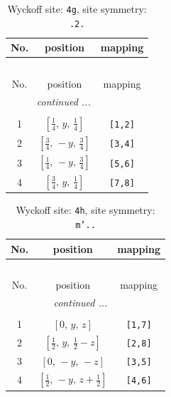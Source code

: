 \documentclass[fleqn,8pt]{jsarticle}
\begin{document}
\renewcommand{\arraystretch}{1.2}
\begin{longtable}{ccc}
\caption{Wyckoff site: {\tt 4g}, site symmetry: {\tt .2.}}
 \\
 \hline \hline
No. & position & mapping \\ \hline \endfirsthead

\multicolumn{2}{l}{\tablename\ \thetable{}} \\
 \hline \hline
No. & position & mapping \\ \hline \endhead

 \hline \hline
\multicolumn{2}{r}{\footnotesize\it continued ...} \\ \endfoot

 \hline \hline
\multicolumn{2}{r}{} \\ \endlastfoot

1 & $\left[ \frac{1}{4},\, y,\, \frac{1}{4} \right]$ & {\tt [1,2]} \\ \hline
2 & $\left[ \frac{3}{4},\, - y,\, \frac{3}{4} \right]$ & {\tt [3,4]} \\ \hline
3 & $\left[ \frac{1}{4},\, - y,\, \frac{3}{4} \right]$ & {\tt [5,6]} \\ \hline
4 & $\left[ \frac{3}{4},\, y,\, \frac{1}{4} \right]$ & {\tt [7,8]} \\
\end{longtable}
\renewcommand{\arraystretch}{1.2}
\begin{longtable}{ccc}
\caption{Wyckoff site: {\tt 4h}, site symmetry: {\tt m'..}}
 \\
 \hline \hline
No. & position & mapping \\ \hline \endfirsthead

\multicolumn{2}{l}{\tablename\ \thetable{}} \\
 \hline \hline
No. & position & mapping \\ \hline \endhead

 \hline \hline
\multicolumn{2}{r}{\footnotesize\it continued ...} \\ \endfoot

 \hline \hline
\multicolumn{2}{r}{} \\ \endlastfoot

1 & $\left[ 0,\, y,\, z \right]$ & {\tt [1,7]} \\ \hline
2 & $\left[ \frac{1}{2},\, y,\, \frac{1}{2} - z \right]$ & {\tt [2,8]} \\ \hline
3 & $\left[ 0,\, - y,\, - z \right]$ & {\tt [3,5]} \\ \hline
4 & $\left[ \frac{1}{2},\, - y,\, z + \frac{1}{2} \right]$ & {\tt [4,6]} \\
\end{longtable}
\end{document}
